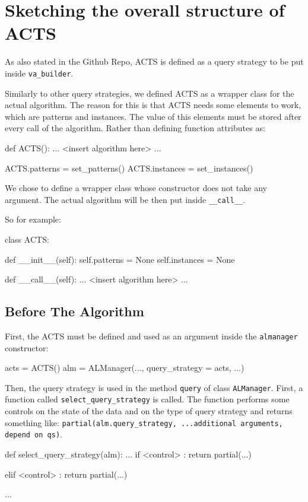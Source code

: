 \section{Sketching the overall structure of ACTS}
As also stated in the Github Repo, ACTS is defined as a query strategy to be put inside \texttt{va\_builder}.

Similarly to other query strategies, we defined ACTS as a wrapper class for the actual algorithm. The reason for
this is that ACTS needs some elements to work, which are patterns and instances. The value of this elements must be 
stored after every call of the algorithm. Rather than defining function attributes as:
\begin{python}
    def ACTS():
        ... 
        <insert algorithm here>
        ... 

    ACTS.patterns = set_patterns()
    ACTS.instances = set_instances()
\end{python}

We chose to define a wrapper class whose constructor does not take any argument. The actual algorithm will be then 
put inside \texttt{\_\_call\_\_}.

So for example:
\begin{python}
    class ACTS:

        def __init__(self):
            self.patterns = None
            self.instances = None
        
        def __call__(self):
            ... 
            <insert algorithm here>
            ... 
            
\end{python}

\subsection{Before The Algorithm}
First, the ACTS must be defined and used as an argument inside the \texttt{almanager} constructor:
\begin{python}
    acts = ACTS()
    alm = ALManager(..., query_strategy = acts, ...)
\end{python}

Then, the query strategy is used in the method \texttt{query} 
of class \texttt{ALManager}. First, a function called
\texttt{select\_query\_strategy} is called. The function performs some controls on the 
state of the data and on the type of query strategy and returns something like: 
\texttt{partial(alm.query\_strategy, ...additional arguments, depend on qs)}.
\begin{python}
    def select_query_strategy(alm):
        ... 
        if <control> :
            return partial(...)
        
        elif <control> : 
            return partial(...)
        
        ...
\end{python}

